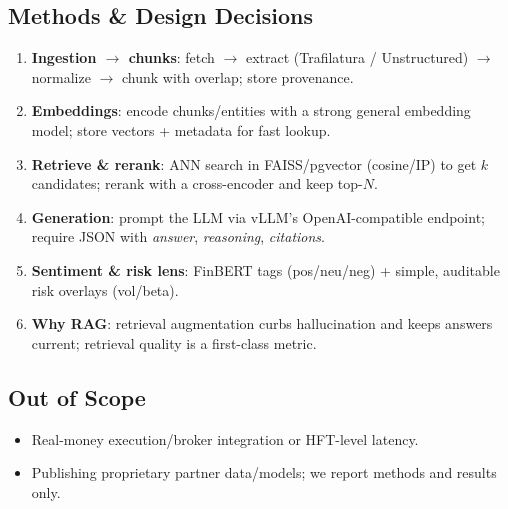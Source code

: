 \subsection{Methods \& Design Decisions}
\begin{enumerate}[leftmargin=*,itemsep=0.25em]
  \item \textbf{Ingestion $\rightarrow$ chunks}: fetch $\rightarrow$ extract (Trafilatura / Unstructured) $\rightarrow$ normalize $\rightarrow$ chunk with overlap; store provenance. \parencite{trafilatura_docs,unstructured_partition}
  \item \textbf{Embeddings}: encode chunks/entities with a strong general embedding model; store vectors + metadata for fast lookup.
  \item \textbf{Retrieve \& rerank}: ANN search in FAISS/pgvector (cosine/IP) to get $k$ candidates; rerank with a cross-encoder and keep top-$N$. \parencite{faiss_2024,pgvector_github,bge_reranker_m3}
  \item \textbf{Generation}: prompt the LLM via vLLM’s OpenAI-compatible endpoint; require JSON with \textit{answer}, \textit{reasoning}, \textit{citations}. \parencite{vllm_docs}
  \item \textbf{Sentiment \& risk lens}: \acf{FinBERT} tags (pos/neu/neg) + simple, auditable risk overlays (vol/beta). \parencite{finbert_araci2019}
  \item \textbf{Why RAG}: retrieval augmentation curbs hallucination and keeps answers current; retrieval quality is a first-class metric. \parencite{rag_hallucination}
\end{enumerate}

\subsection{Out of Scope}
\begin{itemize}
  \item Real-money execution/broker integration or HFT-level latency.
  \item Publishing proprietary partner data/models; we report methods and results only.
\end{itemize}




